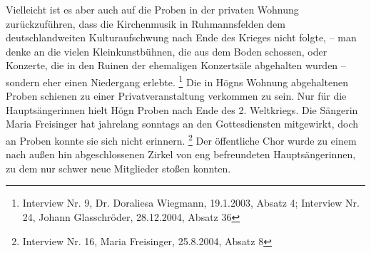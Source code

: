 \documentclass[a4paper]{article}
\begin{document}
Vielleicht ist es aber auch auf die Proben in der privaten Wohnung
zurückzuführen, dass die Kirchenmusik in Ruhmannsfelden dem
deutschlandweiten Kulturaufschwung nach Ende des Krieges nicht folgte,
– man denke an die vielen Kleinkunstbühnen, die aus dem Boden schossen,
oder Konzerte, die in den Ruinen der ehemaligen Konzertsäle abgehalten
wurden – sondern eher einen Niedergang erlebte. \footnote{Interview Nr.
9, Dr. Doraliesa Wiegmann, 19.1.2003, Absatz 4; Interview Nr. 24,
Johann Glasschröder, 28.12.2004, Absatz 36} Die in Högns Wohnung
abgehaltenen Proben schienen zu einer Privatveranstaltung verkommen zu
sein. Nur für die Hauptsängerinnen hielt Högn Proben nach Ende des 2.
Weltkriegs. Die Sängerin Maria Freisinger hat jahrelang sonntags an den
Gottesdiensten mitgewirkt, doch an Proben konnte sie sich nicht
erinnern. \footnote{Interview Nr. 16, Maria Freisinger, 25.8.2004,
Absatz 8} Der öffentliche Chor wurde zu einem nach außen hin
abgeschlossenen Zirkel von eng befreundeten Hauptsängerinnen, zu dem
nur schwer neue Mitglieder stoßen konnten.
\end{document}
